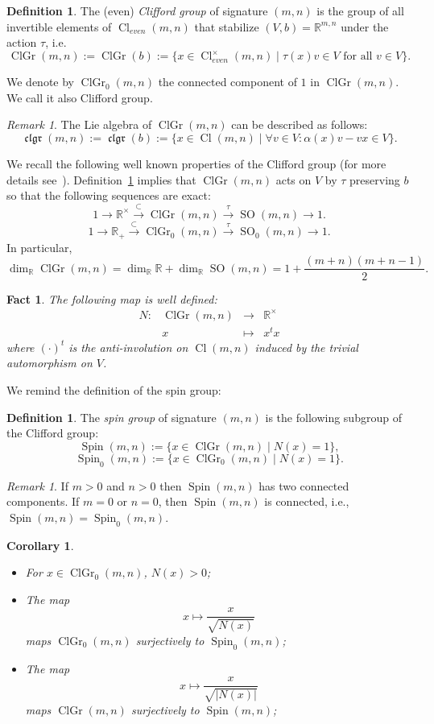 \documentclass[a4paper,oneside,11pt]{amsart}
\DeclareMathOperator{\SO}{SO}
\DeclareMathOperator{\Cl}{Cl}
\DeclareMathOperator{\ClGr}{ClGr}
\DeclareMathOperator{\clgr}{\mathfrak{clgr}}
\DeclareMathOperator{\Spin}{Spin}
\newcommand{\R}{\mathbb R}
\theoremstyle{plain}
\newtheorem{cor}[teo]{Corollary}
\newtheorem{fact}[teo]{Fact}
\theoremstyle{definition}
\newtheorem{df}[teo]{Definition}
\theoremstyle{remark}
\newtheorem{rem}[teo]{Remark}
\newcommand{\defin}{\emph}
\begin{document}
\begin{df}\label{df:ClGroup}
The (even) \defin{Clifford group} of signature $(m,n)$ is the group of all invertible elements of $\Cl_{even}(m,n)$ that stabilize $(V,b)=\R^{m,n}$ under the action $\tau$, i.e.
$$\ClGr(m,n):=\ClGr(b):=\{x\in\Cl_{even}^\times(m,n)\mid \tau(x)v\in V\text{ for all }v\in V\}.$$

\noindent We denote by $\ClGr_0(m,n)$ the connected component of $1$ in $\ClGr(m,n)$. We call it also Clifford group.
\end{df}

\begin{rem}
The Lie algebra of $\ClGr(m,n)$ can be described as follows:
$$\clgr(m,n):=\clgr(b):=\{x\in\Cl(m,n)\mid \forall v\in V:\alpha(x)v-vx\in V\}.$$
\end{rem}

We recall the following well known properties of the Clifford group (for more details see~\cite{Vaz19}). Definition~\ref{df:ClGroup} implies that $\ClGr(m,n)$ acts on $V$ by $\tau$ preserving $b$ so that the following sequences are exact:
$$1\to \R^\times\xrightarrow{\subset}\ClGr(m,n)\xrightarrow{\tau}\SO(m,n)\to 1. $$
$$1\to \R_+\xrightarrow{\subset}\ClGr_0(m,n)\xrightarrow{\tau}\SO_0(m,n)\to 1. $$
In particular,
$$\dim_{\R}\ClGr(m,n)=\dim_{\R}\R+\dim_{\R}\SO(m,n)=1+\frac{(m+n)(m+n-1)}{2}.$$

\begin{fact}
The following map is well defined:
$$\begin{matrix}
N\colon & \ClGr(m,n) & \to & \R^\times\\
& x & \mapsto & x^tx
\end{matrix}$$
where $(\cdot)^t$ is the anti-involution on $\Cl(m,n)$ induced by the trivial automorphism on $V$.
\end{fact}

We remind the definition of the spin group:
\begin{df} The \defin{spin group} of signature $(m,n)$ is the following subgroup of the Clifford group:
$$\Spin(m,n):=\{x\in \ClGr(m,n)\mid N(x)=1\},$$
$$\Spin_0(m,n):=\{x\in \ClGr_0(m,n)\mid N(x)=1\}.$$
\end{df}

\begin{rem}
If $m>0$ and $n>0$ then $\Spin(m,n)$ has two connected components. If $m=0$ or $n=0$, then $\Spin(m,n)$ is connected, i.e., $\Spin(m,n)=\Spin_0(m,n)$.
\end{rem}

\begin{cor}\begin{itemize}
\item For $x\in\ClGr_0(m,n)$, $N(x)>0$;
\item The map $$x\mapsto\frac{x}{\sqrt{N(x)}}$$ maps $\ClGr_0(m,n)$ surjectively to $\Spin_0(m,n)$;
\item The map $$x\mapsto\frac{x}{\sqrt{|N(x)|}}$$ maps $\ClGr(m,n)$ surjectively to $\Spin(m,n)$;
\end{itemize}
\end{cor}
\end{document}
